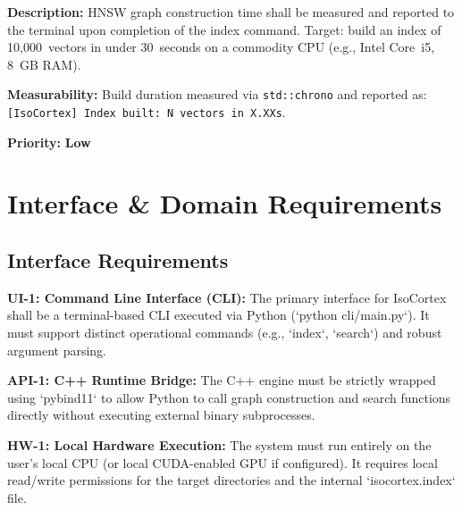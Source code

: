 \documentclass[12pt, a4paper]{article}
\begin{document}
\begin{tcolorbox}[enhanced, colback=white, colframe=ctGold,
    colbacktitle=ctLightGold, coltitle=ctPurple, boxrule=0.5pt,
    leftrule=4pt, arc=2mm, fonttitle=\large\bfseries,
    title={NFR-7: Index Build Latency},
    drop fuzzy shadow=black!5!white]
\begin{prolist}
    \item \textbf{Description:} HNSW graph construction time shall be
    measured and reported to the terminal upon completion of the index
    command. Target: build an index of 10,000~vectors in under 30~seconds
    on a commodity CPU (e.g., Intel Core~i5, 8~GB RAM).

    \item \textbf{Measurability:} Build duration measured via
    \texttt{std::chrono} and reported as:
    \texttt{[IsoCortex] Index built: N vectors in X.XXs}.

    \item \textbf{Priority:} \textcolor{ctGold}{\textbf{Low}}
\end{prolist}
\end{tcolorbox}

\newpage
\section{Interface \& Domain Requirements}

\subsection{Interface Requirements}
\begin{tcolorbox}[standardbox, colback=white, colframe=ctPurple, leftrule=4pt]
\begin{prolist}
    \item \textbf{UI-1: Command Line Interface (CLI):} The primary interface for IsoCortex shall be a terminal-based CLI executed via Python (`python cli/main.py`). It must support distinct operational commands (e.g., `index`, `search`) and robust argument parsing.
    \item \textbf{API-1: C++ Runtime Bridge:} The C++ engine must be strictly wrapped using `pybind11` to allow Python to call graph construction and search functions directly without executing external binary subprocesses.
    \item \textbf{HW-1: Local Hardware Execution:} The system must run entirely on the user's local CPU (or local CUDA-enabled GPU if configured). It requires local read/write permissions for the target directories and the internal `isocortex.index` file.
\end{prolist}
\end{tcolorbox}
\end{document}
